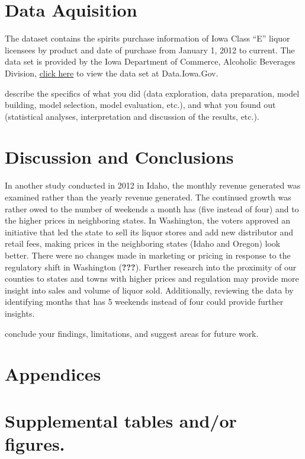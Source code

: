 \documentclass[]{elsarticle} %
\begin{document}
\section{Data Aquisition}\label{data-aquisition}

The dataset contains the spirits purchase information of Iowa Class
``E'' liquor licensees by product and date of purchase from January 1,
2012 to current. The data set is provided by the Iowa Department of
Commerce, Alcoholic Beverages Division,
\href{https://data.iowa.gov/Economy/Iowa-Liquor-Sales/m3tr-qhgy}{click
here} to view the data set at Data.Iowa.Gov.

describe the specifics of what you did (data exploration, data
preparation, model building, model selection, model evaluation, etc.),
and what you found out (statistical analyses, interpretation and
discussion of the results, etc.).

\section{Discussion and Conclusions}\label{discussion-and-conclusions}

In another study conducted in 2012 in Idaho, the monthly revenue
generated was examined rather than the yearly revenue generated. The
continued growth was rather owed to the number of weekends a month has
(five instead of four) and to the higher prices in neighboring states.
In Washington, the voters approved an initiative that led the state to
sell its liquor stores and add new distributor and retail fees, making
prices in the neighboring states (Idaho and Oregon) look better. There
were no changes made in marketing or pricing in response to the
regulatory shift in Washington ({\textbf{???}}). Further research into
the proximity of our counties to states and towns with higher prices and
regulation may provide more insight into sales and volume of liquor
sold. Additionally, reviewing the data by identifying months that has 5
weekends instead of four could provide further insights.

conclude your findings, limitations, and suggest areas for future work.

\newpage

\section{Appendices}\label{appendices}

\section{Supplemental tables and/or
figures.}\label{supplemental-tables-andor-figures.}
\end{document}
